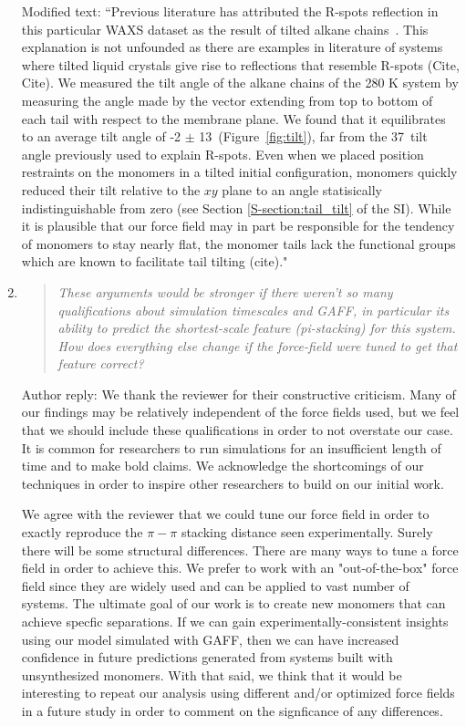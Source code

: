 \documentclass{article}
\begin{document}
\begin{enumerate}
    Modified text: ``Previous literature has attributed the R-spots reflection
    in this particular WAXS dataset as the result of tilted alkane
    chains~\cite{feng_scalable_2014}. {\color{red} This explanation is not
    unfounded as there are examples in literature of systems where tilted liquid
    crystals give rise to reflections that resemble R-spots (Cite, Cite).} We
    measured the tilt angle of the alkane chains of the 280 K system by measuring
    the angle made by the vector extending from top to bottom of each tail with
    respect to the membrane plane.  We found that it equilibrates to an average
    tilt angle of -2 $\pm$ 13\degree~(Figure~\ref{fig:tilt}), far from the
    37\degree~tilt angle previously used to explain R-spots. Even when we placed
    position restraints on the monomers in a tilted initial configuration, monomers
    quickly reduced their tilt relative to the $xy$ plane to an angle statisically
    indistinguishable from zero (see Section \ref{S-section:tail_tilt} of the SI).
    {\color{red} While it is plausible that our force field may in part be
    responsible for the tendency of monomers to stay nearly flat, the monomer tails
    lack the functional groups which are known to facilitate tail tilting (cite).}"

    \item \begin{quote}
    \textit{These arguments would be stronger if there weren't so many
	    qualifications about simulation timescales and GAFF, in particular its ability
	    to predict the shortest-scale feature (pi-stacking) for this system. How does
	    everything else change if the force-field were tuned to get that feature
	    correct?}
    \end{quote}

    Author reply: We thank the reviewer for their constructive criticism. Many
    of our findings may be relatively independent of the force fields used, but we
    feel that we should include these qualifications in order to not overstate our
    case. It is common for researchers to run simulations for an insufficient
    length of time and to make bold claims. We acknowledge the shortcomings of our
    techniques in order to inspire other researchers to build on our initial work. 

    We agree with the reviewer that we could tune our force field in order to
    exactly reproduce the $\pi-\pi$ stacking distance seen experimentally. Surely
    there will be some structural differences. There are many ways to tune a force
    field in order to achieve this. We prefer to work with an "out-of-the-box"
    force field since they are widely used and can be applied to vast number of
    systems. The ultimate goal of our work is to create new monomers that can
    achieve specfic separations.  If we can gain experimentally-consistent insights
    using our model simulated with GAFF, then we can have increased confidence in
    future predictions generated from systems built with unsynthesized monomers.
    With that said, we think that it would be interesting to repeat our analysis
    using different and/or optimized force fields in a future study in order to
    comment on the signficance of any differences.


\end{enumerate}
\end{document}
